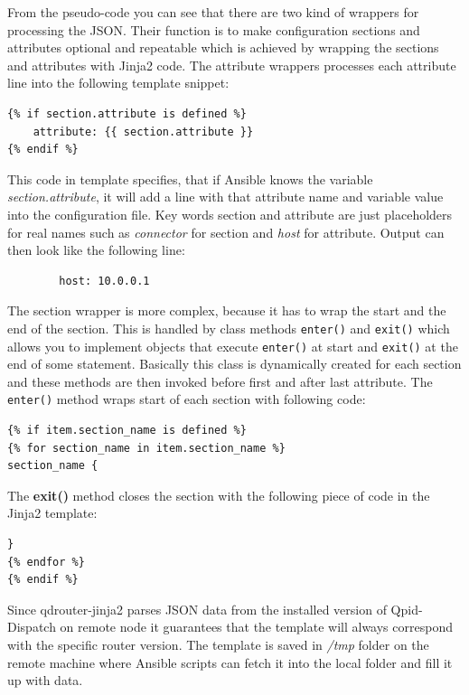 From the pseudo-code you can see that there are two kind of wrappers for processing the JSON. Their function is to make configuration sections and attributes optional and repeatable which is achieved by wrapping the sections and attributes with Jinja2 code. The attribute wrappers processes each attribute line into the following template snippet:

\begin{verbatim}
{% if section.attribute is defined %}
    attribute: {{ section.attribute }}
{% endif %}
\end{verbatim}

This code in template specifies, that if Ansible knows the variable \emph{section.attribute}, it will add a line with that attribute name and variable value into the configuration file. Key words section and attribute are just placeholders for real names such as \emph{connector} for section and \emph{host} for attribute. Output can then look like the following line:

\begin{verbatim}
		host: 10.0.0.1
\end{verbatim}

The section wrapper is more complex, because it has to wrap the start and the end of the section. This is handled by class methods \texttt{\textunderscore enter\textunderscore ()} and \texttt{\textunderscore exit\textunderscore ()} which allows you to implement objects that execute \texttt{\textunderscore enter\textunderscore ()} at start and \texttt{\textunderscore exit\textunderscore ()} at the end of some statement. Basically this class is dynamically created for each section and these methods are then invoked before first and after last attribute. The \texttt{\textunderscore enter\textunderscore ()} method wraps start of each section with following code:

\begin{verbatim}
{% if item.section_name is defined %}
{% for section_name in item.section_name %}
section_name {
\end{verbatim}

The \textbf{\textunderscore exit\textunderscore ()} method closes the section with the following piece of code in the Jinja2 template:
\begin{verbatim}
}
{% endfor %}
{% endif %}
\end{verbatim}

Since qdrouter-jinja2 parses JSON data from the installed version of Qpid-Dispatch on remote node it guarantees that the template will always correspond with the specific router version. The template is saved in \emph{/tmp} folder on the remote machine where Ansible scripts can fetch it into the local folder and fill it up with data.

